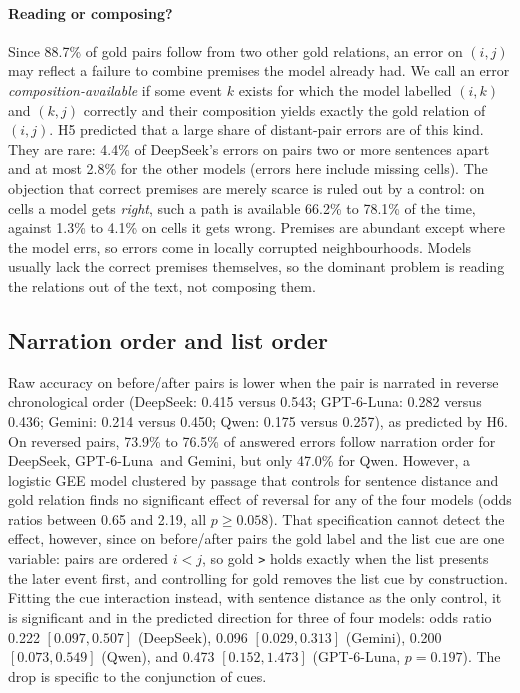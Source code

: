 \documentclass[11pt]{article}
\newcommand{\rel}[1]{\texttt{#1}}
\newcommand{\Ds}{DeepSeek}
\newcommand{\Gp}{GPT-6-Luna}
\newcommand{\Gm}{Gemini}
\newcommand{\Qw}{Qwen}
\begin{document}
\paragraph{Reading or composing?}
Since 88.7\% of gold pairs follow from two other gold relations, an error on $(i,j)$ may reflect a failure to combine premises the model already had. We call an error \emph{composition-available} if some event $k$ exists for which the model labelled $(i,k)$ and $(k,j)$ correctly and their composition yields exactly the gold relation of $(i,j)$. H5 predicted that a large share of distant-pair errors are of this kind. They are rare: 4.4\% of \Ds's errors on pairs two or more sentences apart and at most 2.8\% for the other models (errors here include missing cells). The objection that correct premises are merely scarce is ruled out by a control: on cells a model gets \emph{right}, such a path is available 66.2\% to 78.1\% of the time, against 1.3\% to 4.1\% on cells it gets wrong. Premises are abundant except where the model errs, so errors come in locally corrupted neighbourhoods. Models usually lack the correct premises themselves, so the dominant problem is reading the relations out of the text, not composing them.

\subsection{Narration order and list order}
\label{sec:order}

Raw accuracy on before/after pairs is lower when the pair is narrated in reverse chronological order (\Ds: 0.415 versus 0.543; \Gp: 0.282 versus 0.436; \Gm: 0.214 versus 0.450; \Qw: 0.175 versus 0.257), as predicted by H6. On reversed pairs, 73.9\% to 76.5\% of answered errors follow narration order for \Ds, \Gp\ and \Gm, but only 47.0\% for \Qw. However, a logistic GEE model clustered by passage that controls for sentence distance and gold relation finds no significant effect of reversal for any of the four models (odds ratios between 0.65 and 2.19, all $p\geq 0.058$). That specification cannot detect the effect, however, since on before/after pairs the gold label and the list cue are one variable: pairs are ordered $i<j$, so gold \rel{>} holds exactly when the list presents the later event first, and controlling for gold removes the list cue by construction. Fitting the cue interaction instead, with sentence distance as the only control, it is significant and in the predicted direction for three of four models: odds ratio 0.222 $[0.097, 0.507]$ (\Ds), 0.096 $[0.029, 0.313]$ (\Gm), 0.200 $[0.073, 0.549]$ (\Qw), and 0.473 $[0.152, 1.473]$ (\Gp, $p{=}0.197$). The drop is specific to the conjunction of cues.
\end{document}
